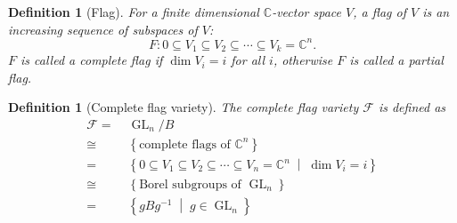 \documentclass[reqno,11pt]{book}
\numberwithin{equation}{section}
\theoremstyle{plain}
\newtheorem{defn}[theorem]{Definition}
\theoremstyle{plain}
\numberwithin{equation}{section}
\theoremstyle{remark}
\DeclareMathOperator{\GL}{\operatorname{GL}}
\begin{document}
\begin{defn}[Flag]
For a finite dimensional $\mathbb{C}$-vector space $V$, a flag of $V$ is an increasing sequence of subspaces of $V$:
$$F: 0 \subseteq V_1 \subseteq V_2 \subseteq \cdots \subseteq V_k = \mathbb{C}^n.$$
$F$ is called a complete flag if $\dim V_i = i$ for all $i$, otherwise $F$ is called a partial flag.
\end{defn}

\begin{defn}[Complete flag variety]
The complete flag variety $\mathcal{F}$ is defined as 
\begin{equation*}
\begin{aligned}
  \mathcal{F}=\;& \GL_n/B \\ 
    \cong\;&  \left\{ \text{complete flags of } \mathbb{C}^n \right\} \\ 
      =\;& \left\{ 0 \subseteq V_1 \subseteq V_2 \subseteq \cdots \subseteq V_n = \mathbb{C}^n \;\middle|\; \dim V_i =i \right\} \\ 
       \cong\;&  \left\{ \text{Borel subgroups of } \GL_n \right\} \\
          =\;& \left\{ gBg^{-1} \;\middle|\; g \in \GL_n \right\} \\ 
\end{aligned}
\end{equation*}
\end{defn}
\end{document}

